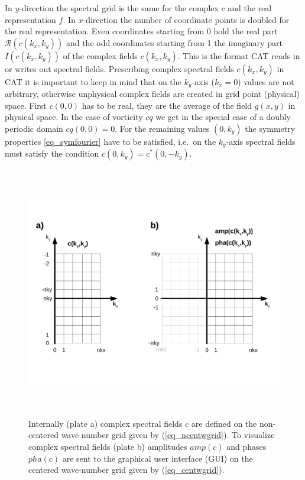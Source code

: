 In $y$-direction the spectral grid is the same for the complex $c$ and
the real representation $f$. In $x$-direction the number of coordinate
points is doubled for the real representation. Even coordinates starting
from $0$ hold the real part $\mathcal{R}(c(k_{x},k_{y}))$ and
the odd coordinates starting from 1 the imaginary part
$I(c(k_{x},k_{y}))$ of the complex fields $c(k_{x},k_{y})$.
This is the format CAT reads in or writes out spectral fields.
Prescribing complex spectral fields $c(k_{x},k_{y})$ in CAT it is important
to keep in mind that on the $k_{y}$-axis ($k_{x} = 0$) values are not
arbitrary, otherwise unphysical complex fields are created in grid point
(physical) space. First $c(0,0)$ has to be real, they are the average of
the field $g(x,y)$ in physical space. In the case of vorticity $cq$
we get in the special case of a doubly periodic domain $cq(0,0) = 0$.
For the remaining values $(0,k_{y})$ the symmetry properties
\ref{eq_symfourier} have to be satisfied, i.e.\ on the $k_{y}$-axis
spectral fields must satisfy the condition $c(0,k_{y}) = c^{*}(0,-k_{y})$.
\begin{figure}
   \includegraphics[height=11cm]{figures/cmplx_cent_grid.pdf}
   \caption{Internally (plate a) complex spectral fields $c$ are defined on
            the non-centered wave number grid given by (\ref{eq_ncentwgrid}).
            To visualize complex spectral fields (plate b) amplitudes
            $amp(c)$ and phases $pha(c)$ are sent to the graphical user
            interface (GUI) on the centered wave-number grid given by
            (\ref{eq_centwgrid}).}
   \label{fig_cspecgrid}
\end{figure}
